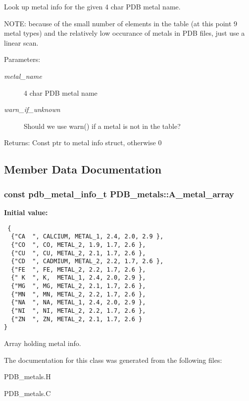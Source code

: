 Look up metal info for the given 4 char PDB metal name. 

NOTE: because of the small number of elements in the table (at this point 9 metal types) and the relatively low occurance of metals in PDB files, just use a linear scan.

\begin{Desc}
\item[Parameters:]
\begin{description}
\item[{\em metal\_\-name}]4 char PDB metal name \item[{\em warn\_\-if\_\-unknown}]Should we use warn() if a metal is not in the table? \end{description}
\end{Desc}
\begin{Desc}
\item[Returns:]Const ptr to metal info struct, otherwise 0 \end{Desc}


\subsection{Member Data Documentation}
\subsubsection{\setlength{\rightskip}{0pt plus 5cm}const \bf{pdb\_\-metal\_\-info\_\-t} \bf{PDB\_\-metals::A\_\-metal\_\-array}\hspace{0.3cm}{\tt  [static, private]}}\label{classSimSite3D_1_1PDB__metals_c8b5b8eb8f21b989c996ca5be4fb4773}


\textbf{Initial value:}

\begin{Code}\begin{verbatim} {
  {"CA  ", CALCIUM, METAL_1, 2.4, 2.0, 2.9 },
  {"CO  ", CO, METAL_2, 1.9, 1.7, 2.6 },
  {"CU  ", CU, METAL_2, 2.1, 1.7, 2.6 },
  {"CD  ", CADMIUM, METAL_2, 2.2, 1.7, 2.6 },
  {"FE  ", FE, METAL_2, 2.2, 1.7, 2.6 },
  {" K  ", K,  METAL_1, 2.4, 2.0, 2.9 },
  {"MG  ", MG, METAL_2, 2.1, 1.7, 2.6 },
  {"MN  ", MN, METAL_2, 2.2, 1.7, 2.6 },
  {"NA  ", NA, METAL_1, 2.4, 2.0, 2.9 },
  {"NI  ", NI, METAL_2, 2.2, 1.7, 2.6 },
  {"ZN  ", ZN, METAL_2, 2.1, 1.7, 2.6 }
}
\end{verbatim}\end{Code}
Array holding metal info. 



The documentation for this class was generated from the following files:\begin{CompactItemize}
\item 
PDB\_\-metals.H\item 
PDB\_\-metals.C\end{CompactItemize}
